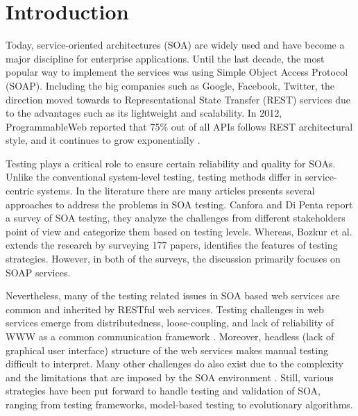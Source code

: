 \documentclass[english]{tktltiki}
\begin{document}
\mytableofcontents

\section{Introduction}
Today, service-oriented architectures (SOA) are widely used and have become a major discipline for enterprise applications. Until the last decade, the most popular way to implement the services was using Simple Object Access Protocol (SOAP). Including the big companies such as Google, Facebook, Twitter, the direction moved towards to Representational State Transfer (REST) services due to the advantages such as its lightweight and scalability. In 2012, ProgrammableWeb reported that 75\% out of all APIs follows REST architectural style, and it continues to grow exponentially \cite{programmableweb}.

Testing plays a critical role to ensure certain reliability and quality for SOAs. Unlike the conventional system-level testing, testing methods differ in service-centric systems. In the literature there are many articles presents several approaches to address the problems in SOA testing. Canfora and Di Penta \cite{canfora2009service} report a survey of SOA testing, they analyze the challenges from different stakeholders point of view and categorize them based on testing levels. Whereas, Bozkur et al. \cite{bozkurt2013testing} extends the research by surveying 177 papers, identifies the features of testing strategies. However, in both of the surveys, the discussion primarily focuses on SOAP services.

Nevertheless, many of the testing related issues in SOA based web services are common and inherited by RESTful web services. Testing challenges in web services emerge from distributedness, loose-coupling, and lack of reliability of WWW as a common communication framework \cite{chakrabarti2009test}. Moreover, headless (lack of graphical user interface) structure of the web services makes manual testing difficult to interpret. Many other challenges do also exist due to the complexity and the limitations that are imposed by the SOA environment \cite{canfora2006testing, canfora2009service, bozkurt2013testing}. Still, various strategies have been put forward to handle testing and validation of SOA, ranging from testing frameworks, model-based testing to evolutionary algorithms.
\end{document}

